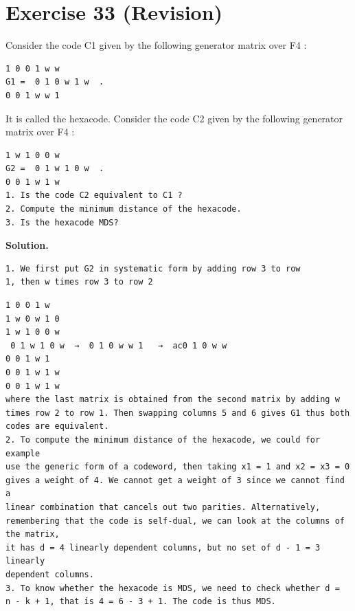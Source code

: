 \documentclass[11pt]{article}
\begin{document}
\section*{Exercise 33 (Revision)}
\begin{exercisebox}
Consider the code C1 given by the following generator matrix over F4 :

\begin{Verbatim}[fontsize=\small]
1 0 0 1 w w
G1 =  0 1 0 w 1 w  .
0 0 1 w w 1
\end{Verbatim}
It is called the hexacode. Consider the code C2 given by the following generator matrix over F4 :

\begin{Verbatim}[fontsize=\small]
1 w 1 0 0 w
G2 =  0 1 w 1 0 w  .
0 0 1 w 1 w
1. Is the code C2 equivalent to C1 ?
2. Compute the minimum distance of the hexacode.
3. Is the hexacode MDS?
\end{Verbatim}
\end{exercisebox}
\begin{solutionbox}
\textbf{Solution.}

\begin{Verbatim}[fontsize=\small]
1. We first put G2 in systematic form by adding row 3 to row
1, then w times row 3 to row 2
\end{Verbatim}
\begin{Verbatim}[fontsize=\small]
1 0 0 1 w
1 w 0 w 1 0
1 w 1 0 0 w
 0 1 w 1 0 w  →  0 1 0 w w 1   →  ac0 1 0 w w
0 0 1 w 1
0 0 1 w 1 w
0 0 1 w 1 w
where the last matrix is obtained from the second matrix by adding w
times row 2 to row 1. Then swapping columns 5 and 6 gives G1 thus both
codes are equivalent.
2. To compute the minimum distance of the hexacode, we could for example
use the generic form of a codeword, then taking x1 = 1 and x2 = x3 = 0
gives a weight of 4. We cannot get a weight of 3 since we cannot find a
linear combination that cancels out two parities. Alternatively, remembering that the code is self-dual, we can look at the columns of the matrix,
it has d = 4 linearly dependent columns, but no set of d - 1 = 3 linearly
dependent columns.
3. To know whether the hexacode is MDS, we need to check whether d =
n - k + 1, that is 4 = 6 - 3 + 1. The code is thus MDS.
\end{Verbatim}
\end{solutionbox}
\end{document}
